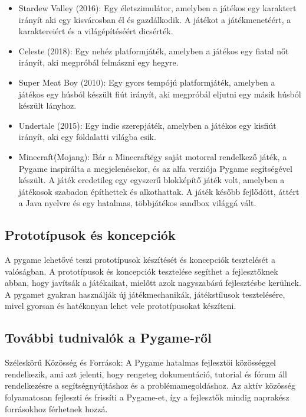 \begin{itemize}
    
    \item Stardew Valley (2016): Egy életszimulátor, amelyben a játékos egy karaktert irányít aki egy kisvárosban él és gazdálkodik. A játékot a játékmenetéért, a karaktereiért és a világépítéséért dicsérték.
    
    \item Celeste (2018): Egy nehéz platformjáték, amelyben a játékos egy fiatal nőt irányít, aki megpróbál felmászni egy hegyre.
    
    \item Super Meat Boy (2010): Egy gyors tempójú platformjáték, amelyben a játékos egy húsból készült fiút irányít, aki megpróbál eljutni egy másik húsból készült lányhoz.
    
    \item Undertale (2015): Egy indie szerepjáték, amelyben a játékos egy kisfiút irányít, aki egy földalatti világba esik.


    \item\"Minecraft\" (Mojang): Bár a \"Minecraft\" egy saját motorral rendelkező játék, a Pygame inspirálta a megjelenésekor, és az alfa verziója Pygame segítségével készült.  A játék eredetileg egy egyszerű blokképítő játék volt, amelyben a játékosok szabadon építhettek és alkothattak. A játék később fejlődött, áttért a Java nyelvre és egy hatalmas, többjátékos sandbox világgá vált.
    
\end{itemize}


\subsection{Prototípusok és koncepciók}
A pygame lehetővé teszi prototípusok készítését és koncepciók tesztelését a valóságban. A prototípusok és koncepciók tesztelése segíthet a fejlesztőknek abban, hogy javítsák a játékaikat, mielőtt azok nagyszabású fejlesztésbe kerülnek. A pygamet gyakran használják új játékmechanikák, játékstílusok tesztelésére, mivel gyorsan és hatékonyan lehet vele prototípusokat készíteni.

\subsection{További tudnivalók a Pygame-ről}

Széleskörű Közösség és Források:
A Pygame hatalmas fejlesztői közösséggel rendelkezik, ami azt jelenti, hogy rengeteg dokumentáció, tutorial és fórum áll rendelkezésre a segítségnyújtáshoz és a problémamegoldáshoz. Az aktív közösség folyamatosan fejleszti és frissíti a Pygame-et, így a fejlesztők mindig naprakész forrásokhoz férhetnek hozzá.


